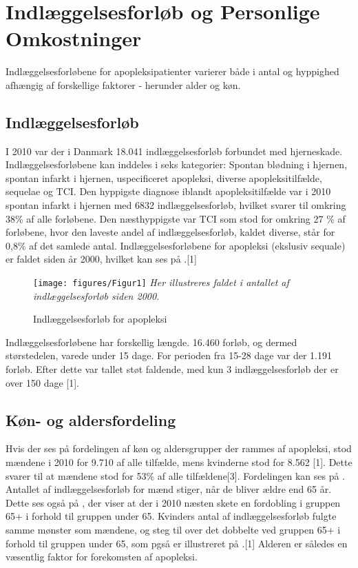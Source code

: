 \section{Indlæggelsesforløb og Personlige Omkostninger}
Indlæggelsesforløbene for apopleksipatienter varierer både i antal og hyppighed afhængig af forskellige faktorer - herunder alder og køn.

\subsection{Indlæggelsesforløb}
I 2010 var der i Danmark 18.041 indlæggelsesforløb forbundet med hjerneskade. Indlæggelsesforløbene kan inddeles i seks kategorier: Spontan blødning i hjernen, spontan infarkt i hjernen, uspecificeret apopleksi, diverse apopleksitilfælde, sequelae og TCI.  Den hyppigste diagnose iblandt apopleksitilfælde var i 2010 spontan infarkt i hjernen med 6832 indlæggelsesforløb, hvilket svarer til omkring 38\% af alle forløbene. Den næsthyppigste var TCI som stod for omkring 27 \% af forløbene, hvor den laveste andel af indlæggelsesforløb, kaldet diverse, står for 0,8\% af det samlede antal.  Indlæggelsesforløbene for apopleksi (ekslusiv sequale) er faldet siden år 2000, hvilket kan ses på .[1]

\begin{figure}[H]
	\caption{Indlæggelsesforløb for apopleksi}
	\label{Indlaeggelser}
	\centering
	\texttt{[image: figures/Figur1]}
	\flushleft
	\textit{Her illustreres faldet i antallet af indlæggelsesforløb siden 2000.}
\end{figure}

Indlæggelsesforløbene har forskellig længde. 16.460 forløb, og dermed størstedelen, varede under 15 dage. For perioden fra 15-28 dage var der 1.191 forløb. Efter dette var tallet støt faldende, med kun 3 indlæggelsesforløb der er over 150 dage [1].

\subsection{Køn- og aldersfordeling}
Hvis der ses på fordelingen af køn og aldersgrupper der rammes af apopleksi, stod mændene i 2010 for 9.710 af alle tilfælde, mens kvinderne stod for 8.562 [1]. Dette svarer til at mændene stod for 53\% af alle tilfældene[3]. Fordelingen kan ses på .  
Antallet af indlæggelsesforløb for mænd stiger, når de bliver ældre end 65 år. Dette ses også på , der viser at der i 2010 næsten skete en fordobling i gruppen 65+ i forhold til gruppen under 65.
Kvinders antal af indlæggelsesforløb fulgte samme mønster som mændene, og steg til over det dobbelte ved gruppen 65+ i forhold til gruppen under 65, som pgså er illustreret på .[1] Alderen er således en væsentlig faktor for forekomsten af apopleksi.


